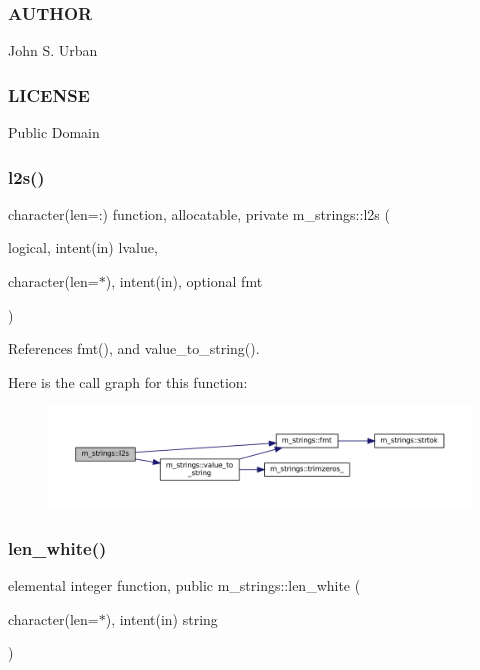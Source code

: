 \subsubsection*{A\+U\+T\+H\+OR}

John S. Urban \subsubsection*{L\+I\+C\+E\+N\+SE}

Public Domain \mbox{\label{namespacem__strings_a75aa4dfd0a231e2bcad03d26231a7c29}} 
\subsubsection{\texorpdfstring{l2s()}{l2s()}}
{\footnotesize\ttfamily character(len=\+:) function, allocatable, private m\+\_\+strings\+::l2s (\begin{DoxyParamCaption}\item[{logical, intent(in)}]{lvalue,  }\item[{character(len=$\ast$), intent(in), optional}]{fmt }\end{DoxyParamCaption})\hspace{0.3cm}{\ttfamily [private]}}



References fmt(), and value\+\_\+to\+\_\+string().

Here is the call graph for this function\+:\nopagebreak
\begin{figure}[H]
\begin{center}
\leavevmode
\includegraphics[width=350pt]{namespacem__strings_a75aa4dfd0a231e2bcad03d26231a7c29_cgraph}
\end{center}
\end{figure}
\mbox{\label{namespacem__strings_aa1427d5dd673ff986236ba1732e693c1}} 
\subsubsection{\texorpdfstring{len\+\_\+white()}{len\_white()}}
{\footnotesize\ttfamily elemental integer function, public m\+\_\+strings\+::len\+\_\+white (\begin{DoxyParamCaption}\item[{character(len=$\ast$), intent(in)}]{string }\end{DoxyParamCaption})}



